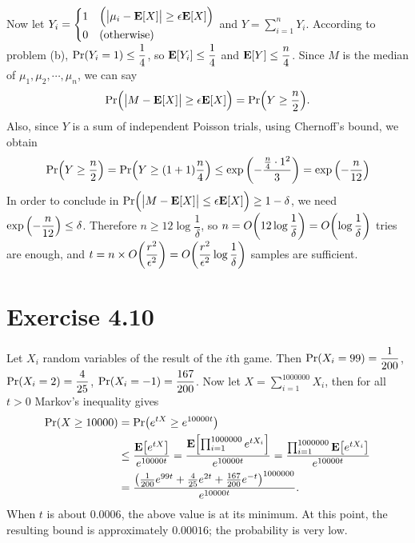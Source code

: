 \documentclass{article}
\begin{document}
\begin{enumerate}[(a)]
  \vspace{3mm}
  Now let $Y_i = \begin{cases}
    1 & \Big(\big|\mu_i - \mathbf{E}\qty[X]\big| \geq \epsilon\mathbf{E}\qty[X]\Big) \\
    0 & \qty(\text{otherwise})
  \end{cases}$
  and $\displaystyle Y = \sum_{i=1}^{n}Y_i$. 
  According to problem (b), $\mathrm{Pr}\qty(Y_i = 1) \leq \dfrac{1}{4}$, so $\mathbf{E}\qty[Y_i] \leq \dfrac{1}{4}$ and $\mathbf{E}\qty[Y] \leq \dfrac{n}{4}$.
  Since $M$ is the median of $\mu_1, \mu_2, \cdots, \mu_n$, we can say
  \begin{align*}
    \mathrm{Pr}\Big(\big|M-\mathbf{E}\qty[X]\big| \geq \epsilon\mathbf{E}\qty[X]\Big) = \mathrm{Pr}\qty(Y \geq \frac{n}{2}).
  \end{align*}
  Also, since $Y$ is a sum of independent Poisson trials, using Chernoff's bound, we obtain
  \begin{align*}
    \mathrm{Pr}\qty(Y \geq \frac{n}{2}) = \mathrm{Pr}\qty(Y \geq (1+1)\frac{n}{4}) \leq \exp\qty(-\frac{\frac{n}{4}\cdot 1^2}{3}) = \exp\qty(-\frac{n}{12})
  \end{align*}
  In order to conclude in $\displaystyle \mathrm{Pr}\Big(\big|M-\mathbf{E}\qty[X]\big| \leq \epsilon\mathbf{E}\qty[X]\Big) \geq 1 - \delta$, we need $\exp\qty(-\dfrac{n}{12}) \leq \delta$.
  Therefore $n \geq 12\log{\dfrac{1}{\delta}}$, so $n = O\qty(12\log{\dfrac{1}{\delta}}) = O\qty(\log{\dfrac{1}{\delta}})$ tries are enough, and $t = n \times O\qty(\dfrac{r^2}{\epsilon^2}) = O\qty(\dfrac{r^2}{\epsilon^2}\log{\dfrac{1}{\delta}})$ samples are sufficient.
\end{enumerate}

\section*{Exercise 4.10}
Let $X_i$ random variables of the result of the $i$th game. Then $\mathrm{Pr}\qty(X_i = 99) = \dfrac{1}{200}$, $\mathrm{Pr}\qty(X_i = 2) = \dfrac{4}{25}$, $\mathrm{Pr}\qty(X_i = -1) = \dfrac{167}{200}$.
Now let $X = \sum_{i=1}^{1000000}X_i$, then for all $t > 0$ Markov's inequality gives
\begin{align*}
  \mathrm{Pr}\qty(X \geq 10000) &= \mathrm{Pr}\qty(e^{tX} \geq e^{10000t}) \\
  &\leq \frac{\mathbf{E}\qty[e^{tX}]}{e^{10000t}} = \frac{\mathbf{E}\qty[\prod_{i=1}^{1000000}e^{tX_i}]}{e^{10000t}} = \frac{\prod_{i=1}^{1000000}\mathbf{E}\qty[e^{tX_i}]}{e^{10000t}} \\
  &= \frac{\qty(\frac{1}{200}e^{99t} + \frac{4}{25}e^{2t} + \frac{167}{200}e^{-t})^{1000000}}{e^{10000t}}.
\end{align*}
When $t$ is about $0.0006$, the above value is at its minimum. 
At this point, the resulting bound is approximately $0.00016$; the probability is very low.
\end{document}
